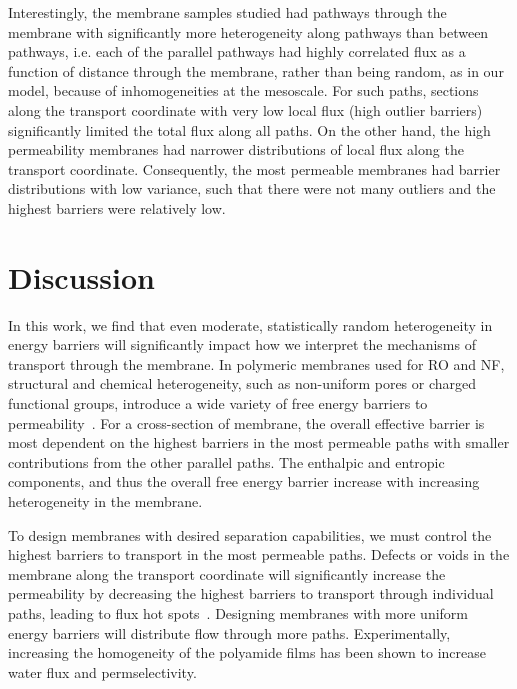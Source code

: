 \documentclass[12pt]{article}
\begin{document}
Interestingly, the membrane samples studied had pathways through the membrane with significantly more heterogeneity along pathways than between pathways, i.e. each of the parallel pathways had highly correlated flux as a function of distance through the membrane, rather than being random, as in our model, because of inhomogeneities at the mesoscale. For such paths, sections along the transport coordinate with very low local flux (high outlier barriers) significantly limited the total flux along all paths. On the other hand, the high permeability membranes had narrower distributions of local flux along the transport coordinate. Consequently, the most permeable membranes had barrier distributions with low variance, such that there were not many outliers and the highest barriers were relatively low.   

\section*{Discussion}

In this work, we find that even moderate, statistically random heterogeneity in energy barriers will significantly impact how we interpret the mechanisms of transport through the membrane. In polymeric membranes used for RO and NF, structural and chemical heterogeneity, such as non-uniform pores or charged functional groups, introduce a wide variety of free energy barriers to permeability~\cite{freger_nanoscale_2003,shefer_enthalpic_2021}. For a cross-section of membrane, the overall effective barrier is most dependent on the highest barriers in the most permeable paths with smaller contributions from the other parallel paths. The enthalpic and entropic components, and thus the overall free energy barrier increase with increasing heterogeneity in the membrane.

To design membranes with desired separation capabilities, we must control the highest barriers to transport in the most permeable paths. Defects or voids in the membrane along the transport coordinate will significantly increase the permeability by decreasing the highest barriers to transport through individual paths, leading to flux hot spots~\cite{ramon_transport_2013}. Designing membranes with more uniform energy barriers will distribute flow through more paths. Experimentally, increasing the homogeneity of the polyamide films has been shown to increase water flux and permselectivity. 
\end{document}
